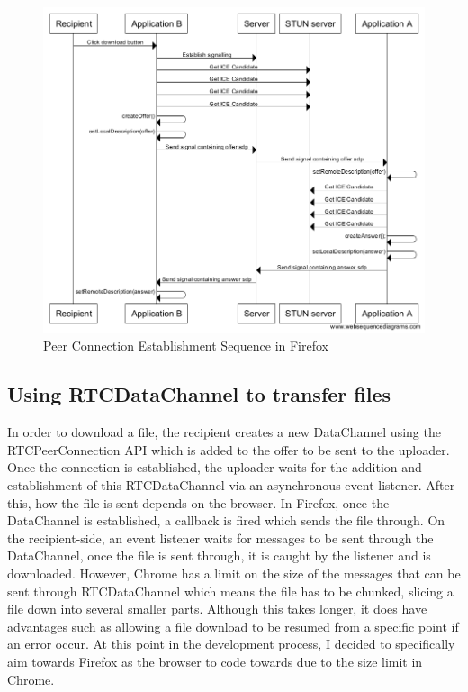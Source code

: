 \documentclass[]{report}
\begin{document}
			\begin{figure}[H]
				\caption{Peer Connection Establishment Sequence in Firefox}
				\centering
				\includegraphics[scale=0.5]{peer-connection-establishment-sequence-firefox.png}
			\end{figure}
			
			\subsection{Using RTCDataChannel to transfer files}
			In order to download a file, the recipient creates a new DataChannel using the RTCPeerConnection API which is added to the offer to be sent to the uploader. Once the connection is established, the uploader waits for the addition and establishment of this RTCDataChannel via an asynchronous event listener. After this, how the file is sent depends on the browser. In Firefox, once the DataChannel is established, a callback is fired which sends the file through. On the recipient-side, an event listener waits for messages to be sent through the DataChannel, once the file is sent through, it is caught by the listener and is downloaded.	However, Chrome has a limit on the size of the messages that can be sent through RTCDataChannel which means the file has to be chunked, slicing a file down into several smaller parts. Although this takes longer, it does have advantages such as allowing a file download to be resumed from a specific point if an error occur. At this point in the development process, I decided to specifically aim towards Firefox as the browser to code towards due to the size limit in Chrome. 
			
\end{document}
